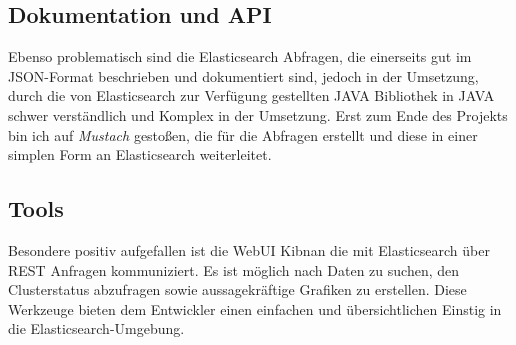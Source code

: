 \subsection{Dokumentation und API}
Ebenso problematisch sind die Elasticsearch Abfragen, die einerseits gut im JSON-Format beschrieben und dokumentiert sind, jedoch in der Umsetzung, durch die von Elasticsearch zur Verfügung gestellten JAVA Bibliothek in JAVA schwer verständlich und Komplex in der Umsetzung.
Erst zum Ende des Projekts bin ich auf \textit{Mustach} gestoßen, die  für die Abfragen erstellt und diese in einer simplen Form an Elasticsearch weiterleitet.  

\subsection{Tools}
Besondere positiv aufgefallen ist die WebUI Kibnan die mit Elasticsearch über REST Anfragen kommuniziert. Es ist möglich nach Daten zu suchen, den Clusterstatus abzufragen sowie aussagekräftige Grafiken zu erstellen. Diese Werkzeuge bieten dem Entwickler einen einfachen und übersichtlichen Einstig in die Elasticsearch-Umgebung. 
